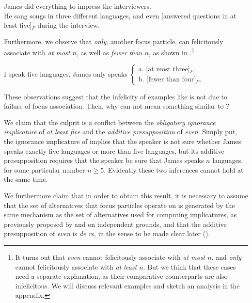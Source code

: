 \documentclass[output=paper]{langscibook}
\begin{document}
    \ea James did everything to impress the interviewers.\\He sang songs in three different languages, and even [answered questions in at least five]$_F$ during the interview.\label{don-sud:broad}
    \z

\noindent Furthermore, we observe that \textit{only}, another focus particle, can felicitously associate with \textit{at most $n$}, as well as \textit{fewer than $n$}, as shown in .\footnote{It turns out that \textit{even} cannot felicitously associate with \textit{at most $n$}, and \textit{only} cannot felicitously associate with \textit{at least $n$}. But we think that these cases need a separate explanation, as their comparative counterparts are also infelicitous. We will discuss relevant examples and sketch an analysis in the appendix.\label{don-sud:fn:appendix}}

    \ea I speak five languages. James only speaks $\left\{\begin{array}{l}\text{a. {[at most three]$_F$}.}\\\text{b.\ {[fewer than four]$_F$}.}\end{array}\right.$
    \label{don-sud:onlyde}
    \z

\noindent These observations suggest that the infelicity of examples like  is not due to failure of focus association. Then, why can  not mean something similar to ?

We claim that the culprit is a conflict between the \textit{obligatory ignorance implicature} of \textit{at least five} and the \textit{additive presupposition} of \textit{even}. Simply put, the ignorance implicature of  implies that the speaker is not sure whether James speaks exactly five languages or more than five languages, but its additive presupposition requires that the speaker be sure that James speaks $n$ languages, for some particular number $n\geq 5$. Evidently these two inferences cannot hold at the same time.

We furthermore claim that in order to obtain this result, it is necessary to assume that the set of alternatives that focus particles operate on is generated by the same mechanism as the set of alternatives used for computing implicatures, as previously proposed by \citet{rooth:92} and \citet{foxkatzir} on independent grounds, and that the additive presupposition of \textit{even} is \textit{de re}, in the sense to be made clear later (\citealt{kripke}).
\end{document}
